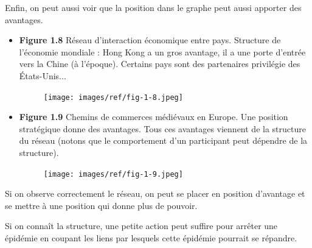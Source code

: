 Enfin, on peut aussi voir que la position dans le graphe peut aussi apporter des avantages.

\begin{itemize}
	\item \textbf{Figure 1.8} Réseau d'interaction économique entre pays. Structure de l'économie mondiale : Hong Kong a un gros avantage, il a une porte d'entrée vers la Chine (à l'époque). Certains pays sont des partenaires privilégie des États-Unis... 
	\begin{figure}[!H]
\centering
\texttt{[image: images/ref/fig-1-8.jpeg]}
\end{figure}

	\item \textbf{Figure 1.9} Chemins de commerces médiévaux en Europe. Une position stratégique donne des avantages. Tous ces avantages viennent de la structure du réseau (notons que le comportement d'un participant peut dépendre de la structure).
\begin{figure}[!H]
\centering
\texttt{[image: images/ref/fig-1-9.jpeg]}
\end{figure}
\end{itemize}

Si on observe correctement le réseau, on peut se placer en position d'avantage et se mettre à une position qui donne plus de pouvoir.

Si on connaît la structure, une petite action peut suffire pour arrêter une épidémie en coupant les liens par lesquels cette épidémie pourrait se répandre.
